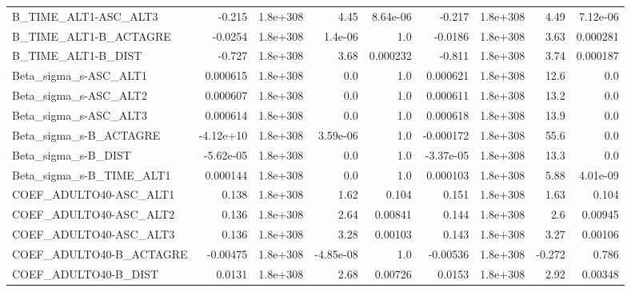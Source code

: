 \begin{tabular}{lrrrrrrrr}
B\_TIME\_ALT1-ASC\_ALT3              &      -0.215 &     1.8e+308 &      4.45 & 8.64e-06 &     -0.217 &    1.8e+308 &         4.49 &      7.12e-06 \\
B\_TIME\_ALT1-B\_ACTAGRE             &     -0.0254 &     1.8e+308 &   1.4e-06 &      1.0 &    -0.0186 &    1.8e+308 &         3.63 &      0.000281 \\
B\_TIME\_ALT1-B\_DIST                &      -0.727 &     1.8e+308 &      3.68 & 0.000232 &     -0.811 &    1.8e+308 &         3.74 &      0.000187 \\
Beta\_sigma\_s-ASC\_ALT1             &    0.000615 &     1.8e+308 &       0.0 &      1.0 &   0.000621 &    1.8e+308 &         12.6 &           0.0 \\
Beta\_sigma\_s-ASC\_ALT2             &    0.000607 &     1.8e+308 &       0.0 &      1.0 &   0.000611 &    1.8e+308 &         13.2 &           0.0 \\
Beta\_sigma\_s-ASC\_ALT3             &    0.000614 &     1.8e+308 &       0.0 &      1.0 &   0.000618 &    1.8e+308 &         13.9 &           0.0 \\
Beta\_sigma\_s-B\_ACTAGRE            &   -4.12e+10 &     1.8e+308 &  3.59e-06 &      1.0 &  -0.000172 &    1.8e+308 &         55.6 &           0.0 \\
Beta\_sigma\_s-B\_DIST               &   -5.62e-05 &     1.8e+308 &       0.0 &      1.0 &  -3.37e-05 &    1.8e+308 &         13.3 &           0.0 \\
Beta\_sigma\_s-B\_TIME\_ALT1          &    0.000144 &     1.8e+308 &       0.0 &      1.0 &   0.000103 &    1.8e+308 &         5.88 &      4.01e-09 \\
COEF\_ADULTO40-ASC\_ALT1            &       0.138 &     1.8e+308 &      1.62 &    0.104 &      0.151 &    1.8e+308 &         1.63 &         0.104 \\
COEF\_ADULTO40-ASC\_ALT2            &       0.136 &     1.8e+308 &      2.64 &  0.00841 &      0.144 &    1.8e+308 &          2.6 &       0.00945 \\
COEF\_ADULTO40-ASC\_ALT3            &       0.136 &     1.8e+308 &      3.28 &  0.00103 &      0.143 &    1.8e+308 &         3.27 &       0.00106 \\
COEF\_ADULTO40-B\_ACTAGRE           &    -0.00475 &     1.8e+308 & -4.85e-08 &      1.0 &   -0.00536 &    1.8e+308 &       -0.272 &         0.786 \\
COEF\_ADULTO40-B\_DIST              &      0.0131 &     1.8e+308 &      2.68 &  0.00726 &     0.0153 &    1.8e+308 &         2.92 &       0.00348 \\

\end{tabular}
